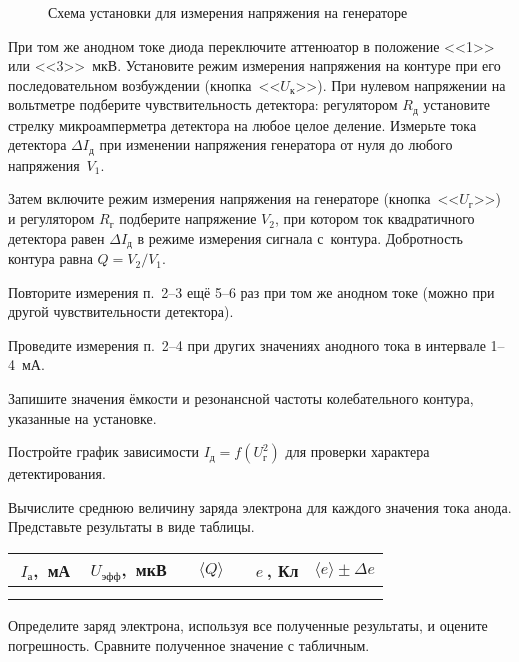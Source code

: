 \begin{lab:task}
\begin{figure}[h!]
    \centering\small
    \caption{Схема установки для измерения напряжения на генераторе}
\end{figure}


	\item При том же анодном токе диода переключите аттенюатор в положение <<1>>
или <<3>>~мкВ. Установите режим измерения
напряжения на контуре при его последовательном возбуждении
(кнопка~<<$U_{\text{к}}$>>). При нулевом напряжении на вольтметре
подберите чувствительность детектора: регулятором $R_{\text{д}}$ установите
стрелку микроамперметра детектора на любое целое
деление. Измерьте  тока детектора $\Delta I_{\text{д}}$
при изменении напряжения генератора от нуля до любого
напряжения~$V_1$.

Затем включите режим измерения напряжения на генераторе
(кнопка~<<$U_{\text{г}}$>>) и регулятором $R_{\text{г}}$ подберите напряжение
$V_2$, при котором ток квадратичного детектора равен 
$\Delta I_{\text{д}}$ в режиме измерения сигнала с~контура.
Добротность контура равна $Q=V_2/V_1$.

	\item Повторите измерения п.~2--3 ещё 5--6 раз при том же
анодном токе (можно при другой чувствительности детектора).

	\item Проведите измерения п.~2--4 при других значениях анодного
тока в интервале 1--4~мА.

	\item Запишите значения ёмкости и резонансной частоты колебательного
контура, указанные на установке.


	\item Постройте график зависимости $I_{\text{д}}=f(U^2_{\text{г}})$ для
проверки характера детектирования.

	\item Вычислите среднюю величину заряда электрона для каждого значения тока
анода. Представьте результаты в виде таблицы.

\begin{center}
\begin{tabular}{|c|c|c|c|c|}
\hline $\;I_{\text{а}}$,~мА&$\;U_{\text{эфф}}$,~мкВ&$\quad\langle
Q\rangle\quad$&$e~$, Кл&$\langle e\rangle\pm\Delta e$\\\hline
 & & & &\\
 & & & &\\
\hline
\end{tabular}
\end{center}

	\item Определите заряд электрона, используя все полученные результаты, и
оцените погрешность. Сравните полученное значение
с табличным.
\end{lab:task}

